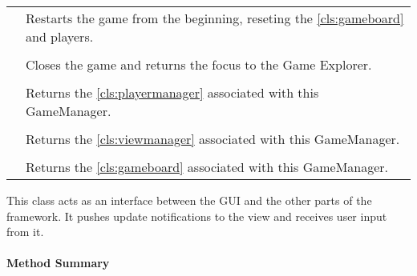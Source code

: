 \begin{longtable}{Lp{10cm}}
	& Restarts the game from the beginning, reseting the \ref{cls:gameboard} and players. \\
	 \\
	& Closes the game and returns the focus to the Game Explorer. \\
	 \\
	& Returns the \ref{cls:playermanager} associated with this GameManager.\\
	 \\
	& Returns the \ref{cls:viewmanager} associated with this GameManager.\\
	 \\
	& Returns the \ref{cls:gameboard} associated with this GameManager.\\
	

	\hline
\end{longtable}

This class acts as an interface between the \gls{GUI} and the other parts of the \gls{framework}. It pushes update notifications to the view and receives user input from it.  \\

\centerdash

\paragraph*{Method Summary}
